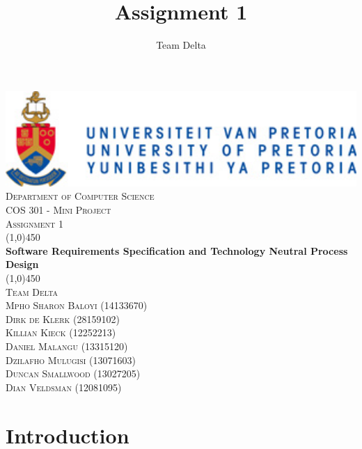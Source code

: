 \documentclass[a4paper,12pt]{article}
\author{Team Delta}
\title{ Assignment 1}
\begin{document}
\setlength{\parskip}{6pt}

	\begin{titlepage}
		\begin{center}
			\includegraphics[width=1\textwidth]{./up-logo.jpg}\\[1.5cm] 
			\textsc{\LARGE Department of Computer Science} \\ [.5cm]
			\textsc{\Large COS 301 - Mini Project} \\ [.5cm]
			\textsc{\Large Assignment 1} \\ [.5cm]
			\line(1,0){450}\\[.5cm]
			\huge{\bfseries Software Requirements Specification and Technology Neutral Process Design}\\
			\line(1,0){450}\\[.5cm]
			\textsc{\LARGE Team Delta}\\ [0.5cm]
			
			
			\textsc{\small Mpho Sharon Baloyi (14133670)}\\
			\textsc{\small Dirk de Klerk (28159102)}\\
			\textsc{\small Killian Kieck (12252213)}\\
			\textsc{\small Daniel Malangu (13315120)}\\
			\textsc{\small Dzilafho Mulugisi (13071603)}\\
			\textsc{\small Duncan Smallwood (13027205)}\\
			\textsc{\small Dian Veldsman (12081095)}\\
			
			
			
			
			
		\end{center}
	\end{titlepage}
	
\tableofcontents
\thispagestyle{empty}
\footnotesize
\normalsize




\newpage
\section{Introduction}
\end{document}
